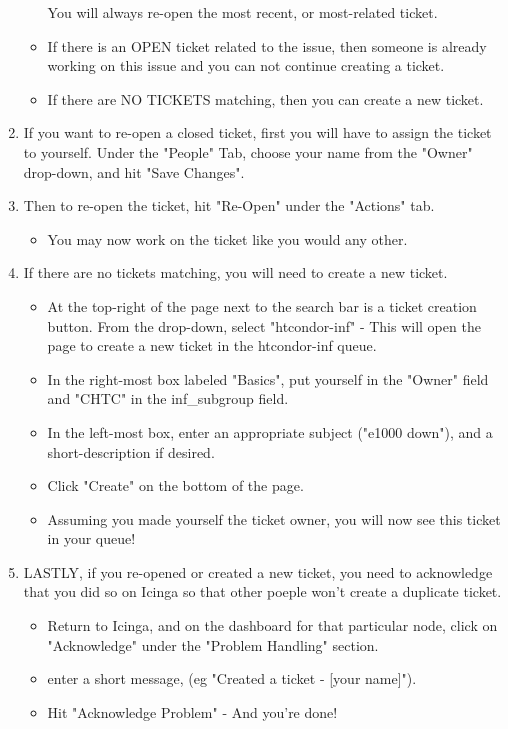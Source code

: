 \documentclass[10pt,letterpaper]{article}
\begin{document}
\begin{enumerate}
\begin{itemize}
            You will always re-open the most recent, or most-related ticket.
            \item If there is an OPEN ticket related to the issue, then someone is
            already working on this issue and you can not continue creating a ticket.
            \item If there are NO TICKETS matching, then you can create a new ticket.
        \end{itemize}
        \item If you want to re-open a closed ticket, first you will have to assign
        the ticket to yourself. Under the "People" Tab, choose your name from the
        "Owner" drop-down, and hit "Save Changes".
        \item Then to re-open the ticket, hit "Re-Open" under the "Actions" tab.
        \begin{itemize}
            \item You may now work on the ticket like you would any other.
        \end{itemize}
        \item If there are no tickets matching, you will need to create a new ticket.
        \begin{itemize}
            \item At the top-right of the page next to the search bar is a ticket creation
            button. From the drop-down, select "htcondor-inf" - This will open the page
            to create a new ticket in the htcondor-inf queue.
            \item In the right-most box labeled "Basics", put yourself in the "Owner"
            field and "CHTC" in the inf\_subgroup field.
            \item In the left-most box, enter an appropriate subject ("e1000 down"),
            and a short-description if desired.
            \item Click "Create" on the bottom of the page.
            \item Assuming you made yourself the ticket owner, you will now see this ticket
            in your queue!
        \end{itemize}
        \item LASTLY, if you re-opened or created a new ticket, you need to acknowledge
        that you did so on Icinga so that other poeple won't create a duplicate ticket.
        \begin{itemize}
            \item Return to Icinga, and on the dashboard for that particular node, click
            on "Acknowledge" under the "Problem Handling" section.
            \item enter a short message, (eg "Created a ticket - [your name]").
            \item Hit "Acknowledge Problem" - And you're done!
        \end{itemize}
    \end{enumerate}
\end{document}
